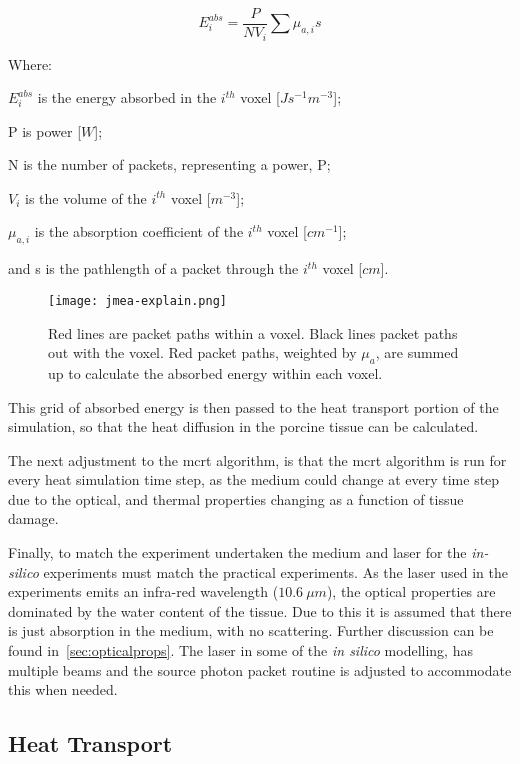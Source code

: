 \begin{equation}
E_{i}^{abs} = \frac{P}{N V_i}\sum\mu_{a,i} s
\label{eqn:Eabs}
\end{equation}

\noindent Where:

	\indent $E_i^{abs}$ is the energy absorbed in the $i^{th}$ voxel [$Js^{-1}m^{-3}$];
	
	\indent P is power [$W$];
	
	\indent N is the number of packets, representing a power, P;
	
	\indent $V_i$ is the volume of the $i^{th}$ voxel [$m^{-3}$];
	
	\indent $\mu_{a,i}$ is the absorption coefficient of the $i^{th}$ voxel [$cm^{-1}$];
	
	\indent and s is the pathlength of a packet through the $i^{th}$ voxel [$cm$].
	
	\medskip
	
\begin{figure}[!ht]
\centering
\texttt{[image: jmea-explain.png]}
\caption{Red lines are packet paths within a voxel. Black lines packet paths out with the voxel. Red packet paths, weighted by $\mu_a$, are summed up to calculate the absorbed energy within each voxel.}
\label{fig:jmea-explain}
\end{figure}	
		
This grid of absorbed energy is then passed to the heat transport portion of the simulation, so that the heat diffusion in the porcine tissue can be calculated.

The next adjustment to the \gls*{mcrt} algorithm, is that the \gls*{mcrt} algorithm is run for every heat simulation time step, as the medium could change at every time step due to the optical, and thermal properties changing as a function of tissue damage.

Finally, to match the experiment undertaken the medium and laser for the \textit{in-silico} experiments must match the practical experiments. As the laser used in the experiments emits an infra-red wavelength ($10.6~\mu m$), the optical properties are dominated by the water content of the tissue. Due to this it is assumed that there is just absorption in the medium, with no scattering. Further discussion can be found in~\cref{sec:opticalprops}. The laser in some of the \textit{in silico} modelling, has multiple beams and the source photon packet routine is adjusted to accommodate this when needed.

\subsection{Heat Transport}

